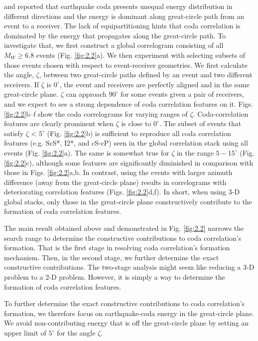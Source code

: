 \citet{sens-schonfelder_lack_2015} and \citet{poli_analysis_2017} reported that earthquake coda presents unequal energy distribution in different directions and the energy is dominant along great-circle path from an event to a receiver. The lack of equipartitioning hints that coda correlation is dominated by the energy that propagates along the great-circle path. To investigate that, we first construct a global correlogram consisting of all $M_W\geq6.8$ events (Fig. \ref{fig:2.2}a). We then experiment with selecting subsets of those events chosen with respect to event-receiver geometries. We first calculate the angle, $\zeta$, between two great-circle paths defined by an event and two different receivers. If $\zeta$ is $0^{\circ}$, the event and receivers are perfectly aligned and in the same great-circle plane. $\zeta$ can approach $90^{\circ}$ for some events given a pair of receivers, and we expect to see a strong dependence of coda correlation features on it. Figs. \ref{fig:2.2}b--f show the coda correlograms for varying ranges of $\zeta$. Coda-correlation features are clearly prominent when $\zeta$ is close to $0^{\circ}$. The subset of events that satisfy $\zeta$ < $5^{\circ}$ (Fig. \ref{fig:2.2}b) is sufficient to reproduce all coda correlation features (e.g. ScS*, I2*, and cS-cP) seen in the global correlation stack using all events (Fig. \ref{fig:2.2}a). The same is somewhat true for $\zeta$ in the range $5-15^{\circ}$ (Fig. \ref{fig:2.2}c), although some features are significantly diminished in comparison with those in Figs. \ref{fig:2.2}a,b. In contrast, using the events with larger azimuth difference (away from the great-circle plane) results in correlograms with deteriorating correlation features (Figs. \ref{fig:2.2}d,f). In short, when using 3-D global stacks, only those in the great-circle plane constructively contribute to the formation of coda correlation features.


The main result obtained above and demonstrated in Fig. \ref{fig:2.2} narrows the search range to determine the constructive contributions to coda correlation's formation. That is the first stage in resolving coda correlation's formation mechanism. Then, in the second stage, we further determine the exact constructive contributions. The two-stage analysis might seem like reducing a 3-D problem to a 2-D problem. However, it is simply a way to determine the formation of coda correlation features.


To further determine the exact constructive contributions to coda correlation's formation, we therefore focus on earthquake-coda energy in the great-circle plane. We avoid non-contributing energy that is off the great-circle plane by setting an upper limit of $5^{\circ}$ for the angle $\zeta$.



